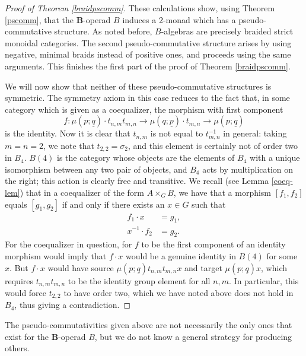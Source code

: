\documentclass{amsbook} %
\newcommand{\mb}{\mathbf}
\numberwithin{section}{chapter}
\begin{document}
\begin{proof}[Proof of Theorem \ref{braidpscomm}]
These calculations show, using Theorem \ref{pscomm}, that the $\mb{B}$-operad $B$ induces a 2-monad which has a pseudo-commutative structure.  As noted before, $B$-algebras are precisely braided strict monoidal categories.  The second pseudo-commutative structure arises by using negative, minimal braids instead of positive ones, and proceeds using the same arguments.  This finishes the first part of the proof of Theorem \ref{braidpscomm}.

We will now show that neither of these pseudo-commutative structures is symmetric.  The symmetry axiom in this case reduces to the fact that, in some category which is given as a coequalizer, the morphism with first component
  \[
    f\colon \mu\left(p; \underline{q}\right) \cdot t_{n,m}t_{m,n} \rightarrow \mu\left(q; \underline{p}\right) \cdot t_{m,n} \rightarrow \mu\left(p; \underline{q}\right)
  \]
is the identity.  Now it is clear that $t_{n,m}$ is not equal to $t_{m,n}^{-1}$ in general: taking $m=n=2$, we note that $t_{2,2} = \sigma_{2}$, and this element is certainly not of order two in $B_{4}$.  $B(4)$ is the category whose objects are the elements of $B_{4}$ with a unique isomorphism between any two pair of objects, and $B_{4}$ acts by multiplication on the right; this action is clearly free and transitive.  We recall (see Lemma \ref{coeq-lem}) that in a coequalizer of the form $A \times_{G} B$, we have that a morphism $[f_{1}, f_{2}]$ equals $[g_{1}, g_{2}]$ if and only if there exists an $x \in G$ such that
  \begin{align*}
    f_{1} \cdot x &= g_{1}, \\
    x^{-1} \cdot f_{2} &= g_{2}.
  \end{align*}
For the coequalizer in question, for $f$ to be the first component of an identity morphism would imply that $f \cdot x$ would be a genuine identity in $B(4)$ for some $x$.  But $f \cdot x$ would have source $\mu\left(p; \underline{q}\right) t_{n,m}t_{m,n}x$ and target $\mu\left(p; \underline{q}\right)x$, which requires $t_{n,m}t_{m,n}$ to be the identity group element for all $n,m$.  In particular, this would force $t_{2,2}$ to have order two, which we have noted above does not hold in $B_{4}$, thus giving a contradiction.
\end{proof}

\begin{rem}
The pseudo-commutativities given above are not necessarily the only ones that exist for the $\mb{B}$-operad $B$, but we do not know a general strategy for producing others.
\end{rem}
\end{document}
